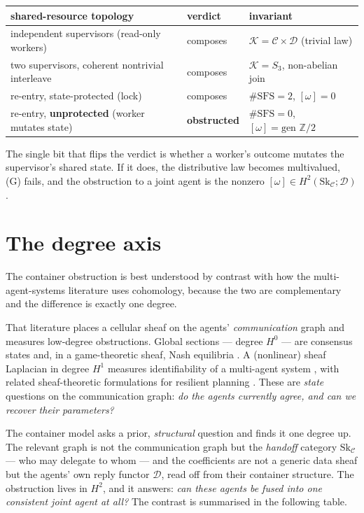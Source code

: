 \documentclass[11pt]{amsart}
\theoremstyle{definition}
\theoremstyle{remark}
\newcommand{\C}{\mathcal{C}}
\newcommand{\D}{\mathcal{D}}
\newcommand{\K}{\mathcal{K}}
\newcommand{\Sk}{\mathrm{Sk}}
\newcommand{\dir}{\mathcal{D}}
\begin{document}
\begin{center}
\renewcommand{\arraystretch}{1.2}
\begin{tabular}{@{}lll@{}}
\toprule
shared-resource topology & verdict & invariant \\
\midrule
independent supervisors (read-only workers) & composes & $\K=\C\times\D$ (trivial law) \\
two supervisors, coherent nontrivial interleave & composes & $\K=S_3$, non-abelian join \\
re-entry, state-protected (lock) & composes & $\#\mathrm{SFS}=2$, $[\omega]=0$ \\
re-entry, \textbf{unprotected} (worker mutates state) & \textbf{obstructed} &
$\#\mathrm{SFS}=0$, $[\omega]=\text{gen }\mathbb Z/2$ \\
\bottomrule
\end{tabular}
\end{center}

\noindent The single bit that flips the verdict is whether a worker's outcome mutates the
supervisor's shared state. If it does, the distributive law becomes multivalued, (G) fails, and
the obstruction to a joint agent is the nonzero $[\omega]\in H^2(\Sk_\C;\dir)$.

\section{The degree axis}\label{sec:degree}

The container obstruction is best understood by contrast with how the multi-agent-systems
literature uses cohomology, because the two are complementary and the difference is exactly one
degree.

That literature places a cellular sheaf on the agents' \emph{communication} graph and measures
low-degree obstructions. Global sections --- degree $H^0$ --- are consensus states and, in a
game-theoretic sheaf, Nash equilibria \cite{sheafMAS}. A (nonlinear) sheaf Laplacian in degree
$H^1$ measures identifiability of a multi-agent system \cite{sheafID}, with related
sheaf-theoretic formulations for resilient planning \cite{sheafPlan}. These are \emph{state}
questions on the communication graph: \emph{do the agents currently agree, and can we recover
their parameters?}

The container model asks a prior, \emph{structural} question and finds it one degree up. The
relevant graph is not the communication graph but the \emph{handoff} category $\Sk_\C$ --- who
may delegate to whom --- and the coefficients are not a generic data sheaf but the agents'
own reply functor $\dir$, read off from their container structure. The obstruction lives in
$H^2$, and it answers: \emph{can these agents be fused into one consistent joint agent at
all?} The contrast is summarised in the following table.
\end{document}
